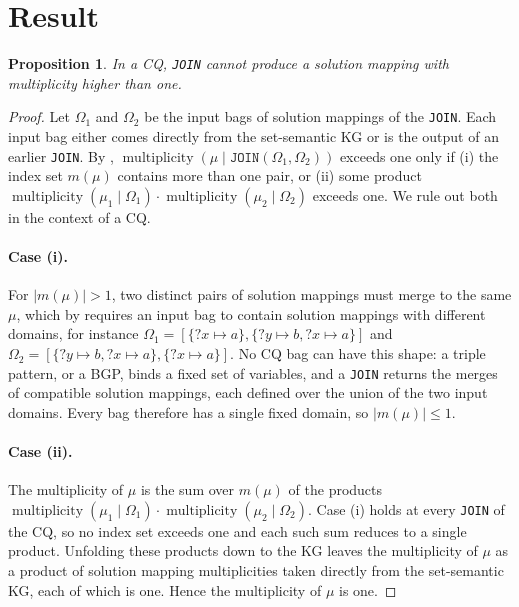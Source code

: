 \documentclass[11pt]{article}
\theoremstyle{plain}
\newtheorem{proposition}{Proposition}
\theoremstyle{definition}
\begin{document}
\section{Result}

\begin{proposition}\label{prop_cq_join_no_dup}
In a CQ, \texttt{JOIN} cannot produce a solution mapping with multiplicity higher than one.
\end{proposition}

\begin{proof}
Let $\Omega_1$ and $\Omega_2$ be the input bags of solution mappings of the \texttt{JOIN}.
Each input bag either comes directly from the set-semantic KG or is the output of an earlier \texttt{JOIN}.
By , $\operatorname{multiplicity}(\mu \mid \texttt{JOIN}(\Omega_1, \Omega_2))$ exceeds one only if (i) the index set $m(\mu)$ contains more than one pair, or (ii) some product $\operatorname{multiplicity}(\mu_1 \mid \Omega_1) \cdot \operatorname{multiplicity}(\mu_2 \mid \Omega_2)$ exceeds one.
We rule out both in the context of a CQ.

\paragraph{Case (i).}
For $|m(\mu)| > 1$, two distinct pairs of solution mappings must merge to the same $\mu$, which by  requires an input bag to contain solution mappings with different domains, for instance $\Omega_1 = [\{?x \mapsto a\}, \{?y \mapsto b, ?x \mapsto a\}]$ and $\Omega_2 = [\{?y \mapsto b, ?x \mapsto a\}, \{?x \mapsto a\}]$.
No CQ bag can have this shape: a triple pattern, or a BGP, binds a fixed set of variables, and a \texttt{JOIN} returns the merges of compatible solution mappings, each defined over the union of the two input domains.
Every bag therefore has a single fixed domain, so $|m(\mu)| \leq 1$.

\paragraph{Case (ii).}
The multiplicity of $\mu$ is the sum over $m(\mu)$ of the products $\operatorname{multiplicity}(\mu_1 \mid \Omega_1) \cdot \operatorname{multiplicity}(\mu_2 \mid \Omega_2)$.
Case (i) holds at every \texttt{JOIN} of the CQ, so no index set exceeds one and each such sum reduces to a single product.
Unfolding these products down to the KG leaves the multiplicity of $\mu$ as a product of solution mapping multiplicities taken directly from the set-semantic KG, each of which is one.
Hence the multiplicity of $\mu$ is one.
\end{proof}



\end{document}

